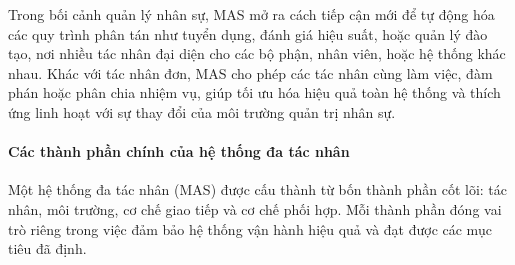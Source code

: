 \documentclass{article}
\begin{document}
Trong bối cảnh quản lý nhân sự, MAS mở ra cách tiếp cận mới để tự động hóa các quy trình phân tán như tuyển dụng, đánh giá hiệu suất, hoặc quản lý đào tạo, nơi nhiều tác nhân đại diện cho các bộ phận, nhân viên, hoặc hệ thống khác nhau. Khác với tác nhân đơn, MAS cho phép các tác nhân cùng làm việc, đàm phán hoặc phân chia nhiệm vụ, giúp tối ưu hóa hiệu quả toàn hệ thống và thích ứng linh hoạt với sự thay đổi của môi trường quản trị nhân sự.

\paragraph{Các thành phần chính của hệ thống đa tác nhân}
Một hệ thống đa tác nhân (MAS) được cấu thành từ bốn thành phần cốt lõi: tác nhân, môi trường, cơ chế giao tiếp và cơ chế phối hợp. Mỗi thành phần đóng vai trò riêng trong việc đảm bảo hệ thống vận hành hiệu quả và đạt được các mục tiêu đã định.
\end{document}
